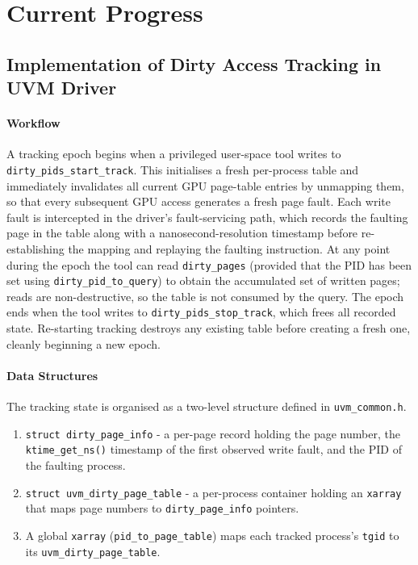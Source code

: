 \section*{Current Progress}



\subsection*{Implementation of Dirty Access Tracking in UVM Driver}

\paragraph{Workflow}
A tracking epoch begins when a privileged user-space tool writes to
\texttt{dirty\_pids\_start\_track}.
This initialises a fresh per-process table and immediately invalidates all
current GPU page-table entries by unmapping them, so that every subsequent GPU
access generates a fresh page fault.
Each write fault is intercepted in the driver's fault-servicing path, which
records the faulting page in the table along with a nanosecond-resolution
timestamp before re-establishing the mapping and replaying the faulting
instruction.
At any point during the epoch the tool can read \texttt{dirty\_pages} 
(provided that the PID has been set using \texttt{dirty\_pid\_to\_query}) to obtain
the accumulated set of written pages; reads are non-destructive, so the table
is not consumed by the query.
The epoch ends when the tool writes to \texttt{dirty\_pids\_stop\_track},
which frees all recorded state. Re-starting tracking destroys any existing
table before creating a fresh one, cleanly beginning a new epoch.

\paragraph{Data Structures}
The tracking state is organised as a two-level structure defined in
\texttt{uvm\_common.h}.

\begin{enumerate}
    \item \texttt{struct dirty\_page\_info} - a per-page record holding the
          page number, the \texttt{ktime\_get\_ns()} timestamp of the first
          observed write fault, and the PID of the faulting process.
    \item \texttt{struct uvm\_dirty\_page\_table} - a per-process container
          holding an \texttt{xarray} that maps page numbers to
          \texttt{dirty\_page\_info} pointers.
    \item A global \texttt{xarray} (\texttt{pid\_to\_page\_table}) maps each
          tracked process's \texttt{tgid} to its \texttt{uvm\_dirty\_page\_table}.
\end{enumerate}

